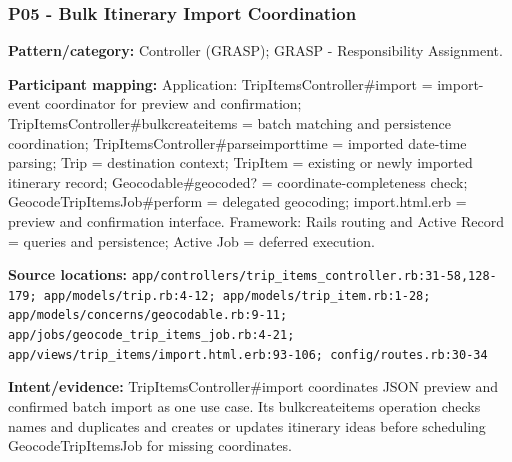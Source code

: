 \documentclass[11pt,a4paper]{article}
\renewcommand{\_}{\textunderscore\allowbreak}
\begin{document}
\subsubsection*{P05 - Bulk Itinerary Import Coordination}
\textbf{Pattern/category:} Controller (GRASP); GRASP - Responsibility Assignment.\par
\textbf{Participant mapping:} Application: TripItemsController\#import = import-event coordinator for preview and confirmation; TripItemsController\#bulk\_create\_items = batch matching and persistence coordination; TripItemsController\#parse\_import\_time = imported date-time parsing; Trip = destination context; TripItem = existing or newly imported itinerary record; Geocodable\#geocoded? = coordinate-completeness check; GeocodeTripItemsJob\#perform = delegated geocoding; import.html.erb = preview and confirmation interface. Framework: Rails routing and Active Record = queries and persistence; Active Job = deferred execution.\par
\textbf{Source locations:} \nolinkurl{app/controllers/trip_items_controller.rb:31-58,128-179; app/models/trip.rb:4-12; app/models/trip_item.rb:1-28; app/models/concerns/geocodable.rb:9-11; app/jobs/geocode_trip_items_job.rb:4-21; app/views/trip_items/import.html.erb:93-106; config/routes.rb:30-34}\par
\textbf{Intent/evidence:} TripItemsController\#import coordinates JSON preview and confirmed batch import as one use case. Its bulk\_create\_items operation checks names and duplicates and creates or updates itinerary ideas before scheduling GeocodeTripItemsJob for missing coordinates.\par
\end{document}
